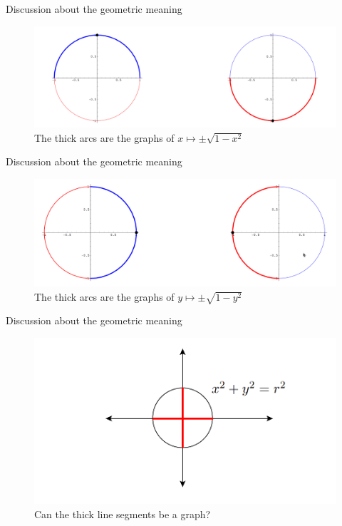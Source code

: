 \begin{frame}{Discussion about the geometric meaning}
    \begin{figure}[h!]
        \includegraphics[width=0.75\linewidth]{figures/implicit_function_example02.png}
        \caption{The thick arcs are the graphs of $x \mapsto \pm \sqrt{1-x^2}$}
    \end{figure}
\end{frame}

\begin{frame}{Discussion about the geometric meaning}
    \begin{figure}[h!]
        \includegraphics[width=0.75\linewidth]{figures/implicit_function_example03.png}
        \caption{The thick arcs are the graphs of $y \mapsto \pm \sqrt{1-y^2}$}
    \end{figure}
\end{frame}

\begin{frame}{Discussion about the geometric meaning}
    \begin{figure}[h!]
        \includegraphics[width=0.75\linewidth]{figures/implicit_function_example04.png}
        \caption{Can the thick line segments be a graph?}
    \end{figure}
\end{frame}


